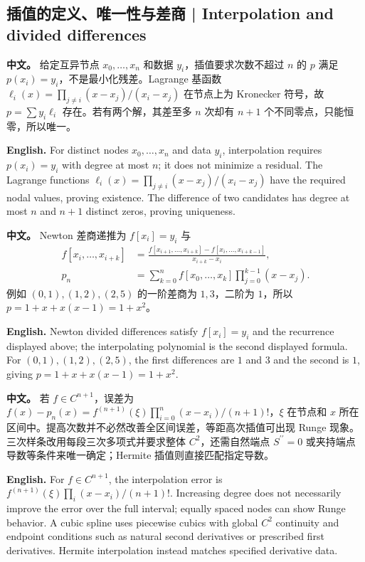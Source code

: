 \documentclass[UTF8,11pt,a4paper]{ctexart}
\newcommand{\APS}[2]{\par\noindent\textbf{中文。} #1\par\noindent\textbf{English.} #2\par\smallskip}
\begin{document}
\subsection{插值的定义、唯一性与差商 | Interpolation and divided differences}
\APS{给定互异节点 $x_0,\ldots,x_n$ 和数据 $y_i$，插值要求次数不超过 $n$ 的 $p$ 满足 $p(x_i)=y_i$，不是最小化残差。Lagrange 基函数 $\ell_i(x)=\prod_{j\ne i}(x-x_j)/(x_i-x_j)$ 在节点上为 Kronecker 符号，故 $p=\sum y_i\ell_i$ 存在。若有两个解，其差至多 $n$ 次却有 $n+1$ 个不同零点，只能恒零，所以唯一。}{For distinct nodes $x_0,\ldots,x_n$ and data $y_i$, interpolation requires $p(x_i)=y_i$ with degree at most $n$; it does not minimize a residual. The Lagrange functions $\ell_i(x)=\prod_{j\ne i}(x-x_j)/(x_i-x_j)$ have the required nodal values, proving existence. The difference of two candidates has degree at most $n$ and $n+1$ distinct zeros, proving uniqueness.}
\APS{Newton 差商递推为 $f[x_i]=y_i$ 与
\[
\begin{aligned}
f[x_i,\ldots,x_{i+k}]&=\frac{f[x_{i+1},\ldots,x_{i+k}]-f[x_i,\ldots,x_{i+k-1}]}{x_{i+k}-x_i},\\
p_n&=\sum_{k=0}^{n}f[x_0,\ldots,x_k]\prod_{j=0}^{k-1}(x-x_j).
\end{aligned}
\]
例如 $(0,1),(1,2),(2,5)$ 的一阶差商为 $1,3$，二阶为 $1$，所以 $p=1+x+x(x-1)=1+x^2$。}{Newton divided differences satisfy $f[x_i]=y_i$ and the recurrence displayed above; the interpolating polynomial is the second displayed formula. For $(0,1),(1,2),(2,5)$, the first differences are $1$ and $3$ and the second is $1$, giving $p=1+x+x(x-1)=1+x^2$.}
\APS{若 $f\in C^{n+1}$，误差为 $f(x)-p_n(x)=f^{(n+1)}(\xi)\prod_{i=0}^n(x-x_i)/(n+1)!$，$\xi$ 在节点和 $x$ 所在区间中。提高次数并不必然改善全区间误差，等距高次插值可出现 Runge 现象。三次样条改用每段三次多项式并要求整体 $C^2$，还需自然端点 $S^{\prime\prime}=0$ 或夹持端点导数等条件来唯一确定；Hermite 插值则直接匹配指定导数。}{For $f\in C^{n+1}$, the interpolation error is $f^{(n+1)}(\xi)\prod_i(x-x_i)/(n+1)!$. Increasing degree does not necessarily improve the error over the full interval; equally spaced nodes can show Runge behavior. A cubic spline uses piecewise cubics with global $C^2$ continuity and endpoint conditions such as natural second derivatives or prescribed first derivatives. Hermite interpolation instead matches specified derivative data.}
\end{document}
